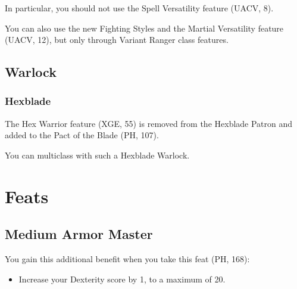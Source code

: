 \documentclass[House_Rules.tex]{subfiles}
\begin{document}
In particular, you should not use the Spell Versatility feature (UACV, 8).

You can also use the new Fighting Styles and the Martial Versatility feature (UACV, 12), but only through Variant Ranger class features.

\subsection{Warlock}

\subsubsection{Hexblade}
The Hex Warrior feature (XGE, 55) is removed from the Hexblade Patron and added to the Pact of the Blade (PH, 107).

You can multiclass with such a Hexblade Warlock.




\section{Feats}
\subsection{Medium Armor Master}

You gain this additional benefit when you take this feat (PH, 168):

\begin{itemize}
\item Increase your Dexterity score by 1, to a maximum of 20.
\end{itemize}
\end{document}

